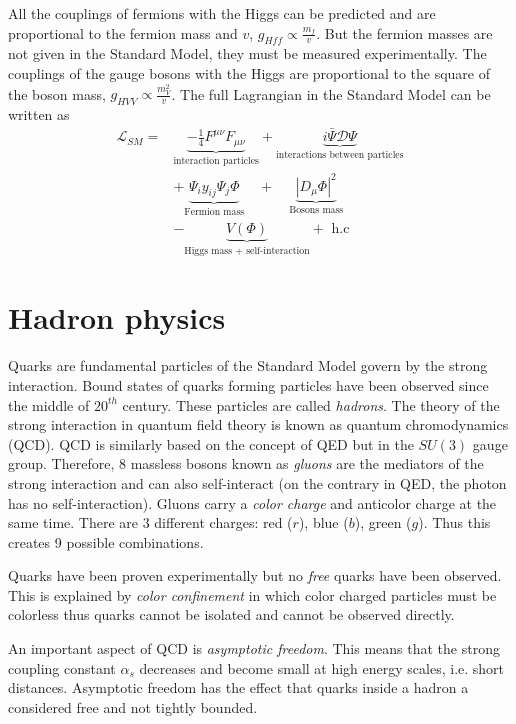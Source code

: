 All the couplings of fermions with the Higgs can be predicted and are proportional to the fermion mass and $v$, $g_{Hff} \propto \frac{m_f}{v}$. But the fermion masses are not given in the Standard Model, they must be measured experimentally. The couplings of the gauge bosons with the Higgs are proportional to the square of the boson mass, $g_{HVV} \propto \frac{m_V^2}{v}$. The full Lagrangian in the Standard Model can be written as \cite{Woithe:2017lzd}
\begin{equation}
  \begin{aligned}
    \mathcal{L}_{SM} = &\underbrace{-\frac{1}{4}F^{\mu\nu}F_{\mu\nu}}_{\text{interaction particles}} + \underbrace{i\bar{\Psi}\mathcal{D}\Psi}_{\text{interactions between particles}} \\
    &+ \underbrace{\Psi_iy_{ij}\Psi_j\Phi}_{\text{Fermion mass}} \quad + \quad \underbrace{|D_{\mu}\Phi|^2}_{\text{Bosons mass}}\\
    &- \underbrace{V(\Phi)}_{\text{Higgs mass + self-interaction}} + \text{ h.c}
  \end{aligned}
\end{equation}

\section{Hadron physics}

Quarks are fundamental particles of the Standard Model govern by the strong interaction. Bound states of quarks forming particles have been observed since the middle of $20^{th}$ century. These particles are called \textit{hadrons}. The theory of the strong interaction in quantum field theory is known as quantum chromodynamics (QCD). QCD is similarly based on the concept of QED but in the $SU(3)$ gauge group. Therefore, 8 massless bosons known as \textit{gluons} are the mediators of the strong interaction and can also self-interact (on the contrary in QED, the photon has no self-interaction). Gluons carry a \textit{color charge} and anticolor charge at the same time. There are 3 different charges: red ($r$), blue ($b$), green ($g$). Thus this creates 9 possible combinations.

Quarks have been proven experimentally but no \textit{free} quarks have been observed. This is explained by \textit{color confinement} in which color charged particles must be colorless thus quarks cannot be isolated and cannot be observed directly.

An important aspect of QCD is \textit{asymptotic freedom}. This means that the strong coupling constant $\alpha_s$ decreases and become small at high energy scales, i.e. short distances. Asymptotic freedom has the effect that quarks inside a hadron a considered free and not tightly bounded.

